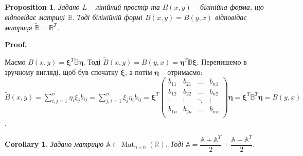 \documentclass[a4paper, 10pt]{article}
\makeatletter
\theoremstyle{theoremdd}
\newtheorem{proposition}[theorem]{Proposition}
\newtheorem{corollary}[theorem]{Corollary}
\DeclareMathOperator{\Mat}{Mat}
\renewenvironment{proof}[1][Proof.\\]{\par
\pushQED{\hfill \qed}%
\normalfont \topsep6\p@\@plus6\p@\relax
\trivlist
\item\relax
{\bfseries
#1\@addpunct{.}}\hspace\labelsep\ignorespaces
}{%
\popQED\endtrivlist\@endpefalse
}
\makeatother
\begin{document}
\begin{proposition}
Задано $L$ -- лінійний простір та $B(x,y)$ -- білінійна форма, що відповідає матриці $\mathbb{B}$. Тоді білінійній формі $\widetilde{B}(x,y) = B(y,x)$ відповідає матриця $\widetilde{\mathbb{B}} = \mathbb{B}^T$.
\end{proposition}

\begin{proof}
Маємо $B(x,y) = \bm{\xi}^T \mathbb{B} \bm{\eta}$. Тоді $\widetilde{B}(x,y) = B(y,x) = \bm{\eta}^T \mathbb{B} \bm{\xi}$. Перепишемо в зручному вигляді, щоб був спочатку $\bm{\xi}$, а потім $\bm{\eta}$ -- отримаємо:\\
$\widetilde{B}(x,y) = \displaystyle\sum_{i,j=1}^n \eta_i \xi_j b_{ij} = \displaystyle\sum_{j,i=1}^n \xi_j \eta_i b_{ij} = \bm{\xi}^T \begin{pmatrix}
b_{11} & b_{21} & \dots & b_{n1} \\
b_{12} & b_{22} & \dots & b_{n2} \\
\vdots & \vdots & \ddots & \vdots \\
b_{1n} & b_{2n} & \dots & b_{nn} \\
\end{pmatrix} \bm{\eta} = \bm{\xi}^T \mathbb{B}^T \bm{\eta} = B(y,x)$.
\end{proof}

\begin{corollary}
Задано матрицю $\mathbb{A} \in \Mat_{n \times n}(\mathbb{R})$. Тоді $\mathbb{A} = \dfrac{\mathbb{A} + \mathbb{A}^T}{2} + \dfrac{\mathbb{A} - \mathbb{A}^T}{2}$.
\end{corollary}
\end{document}
